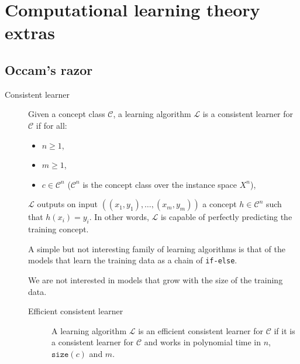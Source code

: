 \chapter{Computational learning theory extras}


\section{Occam's razor}

\begin{description}
    \item[Consistent learner] 
        Given a concept class $\mathcal{C}$, a learning algorithm $\mathcal{L}$ is a consistent learner for $\mathcal{C}$ if for all:
        \begin{itemize}
            \item $n \geq 1$,
            \item $m \geq 1$,
            \item $c \in \mathcal{C}^n$ ($\mathcal{C}^n$ is the concept class over the instance space $X^n$), 
        \end{itemize}
        $\mathcal{L}$ outputs on input $((x_1, y_1), \dots, (x_m, y_m))$ a concept $h \in \mathcal{C}^n$ such that $h(x_i) = y_i$.
        In other words, $\mathcal{L}$ is capable of perfectly predicting the training concept.


        \begin{remark}
            A simple but not interesting family of learning algorithms is that of the models 
            that learn the training data as a chain of \texttt{if-else}.

            We are not interested in models that grow with the size of the training data.
        \end{remark}

        \begin{description}
            \item[Efficient consistent learner] 
                A learning algorithm $\mathcal{L}$ is an efficient consistent learner for $\mathcal{C}$
                if it is a consistent learner for $\mathcal{C}$ and works in polynomial time in $n$, $\texttt{size}(c)$ and $m$.
        \end{description}
\end{description}

